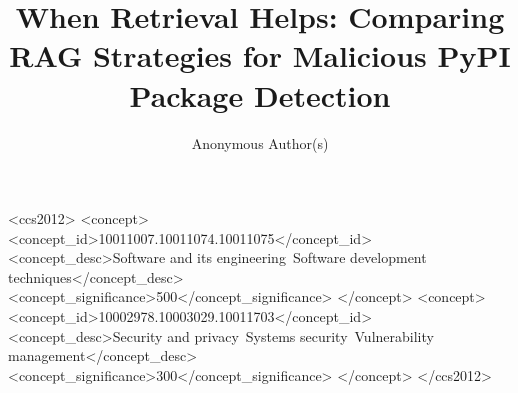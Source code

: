 \documentclass[sigconf, anonymous, review, nonacm]{acmart}
\begin{document}
\title{When Retrieval Helps: Comparing RAG Strategies for Malicious PyPI Package Detection}

\author{Anonymous Author(s)}



\begin{CCSXML}
<ccs2012>
 <concept>
  <concept_id>10011007.10011074.10011075</concept_id>
  <concept_desc>Software and its engineering~Software development techniques</concept_desc>
  <concept_significance>500</concept_significance>
 </concept>
 <concept>
  <concept_id>10002978.10003029.10011703</concept_id>
  <concept_desc>Security and privacy~Systems security~Vulnerability management</concept_desc>
  <concept_significance>300</concept_significance>
 </concept>
</ccs2012>
\end{CCSXML}


\maketitle













\end{document}
